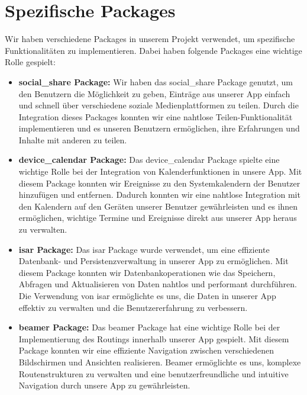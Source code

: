 \section{Spezifische Packages}

Wir haben verschiedene Packages in unserem Projekt verwendet, um spezifische Funktionalitäten zu implementieren. Dabei haben folgende Packages eine wichtige Rolle gespielt:

\begin{itemize}
\item \textbf{social\_share Package:} Wir haben das social\_share Package genutzt, um den Benutzern die Möglichkeit zu geben, Einträge aus unserer App einfach und schnell über verschiedene soziale Medienplattformen zu teilen. Durch die Integration dieses Packages konnten wir eine nahtlose Teilen-Funktionalität implementieren und es unseren Benutzern ermöglichen, ihre Erfahrungen und Inhalte mit anderen zu teilen.

\item \textbf{device\_calendar Package:} Das device\_calendar Package spielte eine wichtige Rolle bei der Integration von Kalenderfunktionen in unsere App. Mit diesem Package konnten wir Ereignisse zu den Systemkalendern der Benutzer hinzufügen und entfernen. Dadurch konnten wir eine nahtlose Integration mit den Kalendern auf den Geräten unserer Benutzer gewährleisten und es ihnen ermöglichen, wichtige Termine und Ereignisse direkt aus unserer App heraus zu verwalten.

\newpage

\item \textbf{isar Package:} Das isar Package wurde verwendet, um eine effiziente Datenbank- und Persistenzverwaltung in unserer App zu ermöglichen. Mit diesem Package konnten wir Datenbankoperationen wie das Speichern, Abfragen und Aktualisieren von Daten nahtlos und performant durchführen. Die Verwendung von isar ermöglichte es uns, die Daten in unserer App effektiv zu verwalten und die Benutzererfahrung zu verbessern.


\item \textbf{beamer Package:} Das beamer Package hat eine wichtige Rolle bei der Implementierung des Routings innerhalb unserer App gespielt. Mit diesem Package konnten wir eine effiziente Navigation zwischen verschiedenen Bildschirmen und Ansichten realisieren. Beamer ermöglichte es uns, komplexe Routenstrukturen zu verwalten und eine benutzerfreundliche und intuitive Navigation durch unsere App zu gewährleisten.

\end{itemize}

